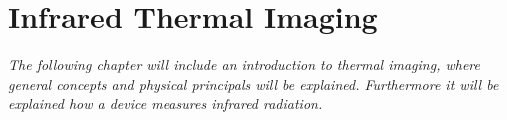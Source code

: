 \chapter{Infrared Thermal Imaging}

\textit{The following chapter will include an introduction to thermal imaging, where general concepts and physical principals will be explained. Furthermore it will be explained how a device measures infrared radiation.}